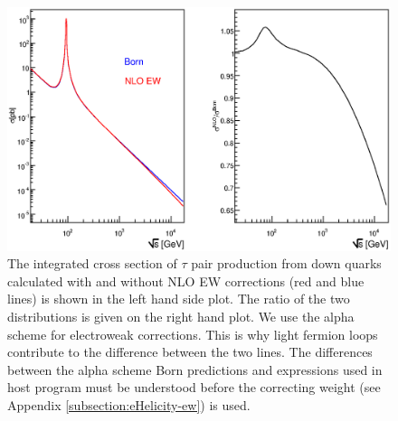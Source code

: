 \documentclass[]{Tauola_interface_design}
\begin{document}
\begin{figure}[h!]
\centering
\includegraphics[scale=0.76]{figures/2d2tau_sigma.eps}
\caption{\label{fig:sigmaDown} 
 The integrated cross section of $\tau$ pair production from down quarks  
calculated with and without NLO
EW corrections (red and blue lines) is shown in the left hand side plot. 
The ratio of the two distributions 
is given on the right hand plot.   
We use the alpha scheme for electroweak corrections. This is why 
light fermion loops contribute to the difference between the two lines.
 The differences between the alpha scheme Born predictions  and expressions
used in  host program
must be understood before the correcting weight (see Appendix \ref{subsection:eHelicity-ew}) is used.
 }
\end{figure}
\end{document}
